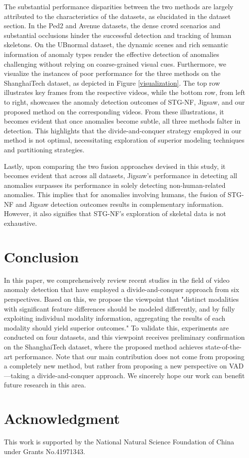 \documentclass[conference]{IEEEtran}
\begin{document}
The substantial performance disparities between the two methods are largely attributed to the characteristics of the datasets, as elucidated in the dataset section. In the Ped2 and Avenue datasets, the dense crowd scenarios and substantial occlusions hinder the successful detection and tracking of human skeletons. On the UBnormal dataset, the dynamic scenes and rich semantic information of anomaly types render the effective detection of anomalies challenging without relying on coarse-grained visual cues. Furthermore, we visualize the instances of poor performance for the three methods on the ShanghaiTech dataset, as depicted in Figure \ref{visualization}. The top row illustrates key frames from the respective videos, while the bottom row, from left to right, showcases the anomaly detection outcomes of STG-NF, Jigsaw, and our proposed method on the corresponding videos. From these illustrations, it becomes evident that once anomalies become subtle, all three methods falter in detection. This highlights that the divide-and-conquer strategy employed in our method is not optimal, necessitating exploration of superior modeling techniques and partitioning strategies.

Lastly, upon comparing the two fusion approaches devised in this study, it becomes evident that across all datasets, Jigsaw's performance in detecting all anomalies surpasses its performance in solely detecting non-human-related anomalies. This implies that for anomalies involving humans, the fusion of STG-NF and Jigsaw detection outcomes results in complementary information. However, it also signifies that STG-NF's exploration of skeletal data is not exhaustive.

\begin{figure*}[htbp]
\begin{center}
\end{center}
\caption{Visualization of Predictive Results for STG-NF\cite{STG-NF}, Jigsaw\cite{jigsaw}, and Proposed Method on ShanghaiTech Dataset.}
\label{visualization}
\end{figure*}




\section{Conclusion}
In this paper, we comprehensively review recent studies in the field of video anomaly detection that have employed a divide-and-conquer approach from six perspectives. Based on this, we propose the viewpoint that "distinct modalities with significant feature differences should be modeled differently, and by fully exploiting individual modality information, aggregating the results of each modality should yield superior outcomes." To validate this, experiments are conducted on four datasets, and this viewpoint receives preliminary confirmation on the ShanghaiTech dataset, where the proposed method achieves state-of-the-art performance. Note that our main contribution does not come from proposing a completely new method, but rather from proposing a new perspective on VAD—taking a divide-and-conquer approach. We sincerely hope our work can benefit future research in this area.

\section*{Acknowledgment}
This work is supported by the National Natural Science Foundation of China under Grants No.41971343.

\end{document}
